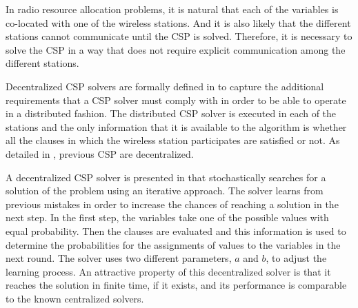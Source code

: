 \documentclass[journal]{IEEEtran}
\newcommand{\Az}[1]{{\color{blue}{#1}}}
\newcommand{\AzCom}[1]{{\it \color{magenta} [#1]}}
\begin{document}
In radio resource allocation problems, it is natural that each of the variables is co-located with one of the wireless stations.
And it is also likely that the different stations cannot communicate until the CSP is solved.
Therefore, it is necessary to solve the CSP in a way that does not require explicit communication among the different stations.

Decentralized CSP solvers are formally defined in \cite{duffy2011dcs} to capture the additional requirements that a CSP solver must comply with in order to be able to operate in a distributed fashion.
The distributed CSP solver is executed in each of the stations and the only information that it is available to the algorithm is whether all the clauses in which the wireless station participates are satisfied or not.
As detailed in \cite{duffy2011dcs}, previous CSP are decentralized.



A decentralized CSP solver is presented in \cite{duffy2011dcs} that stochastically searches for a solution of the problem using an iterative approach. The solver learns from previous mistakes in order to increase the chances of reaching a solution in the next step. In the first step, the variables take one of the possible values with equal probability. Then the clauses are evaluated and this information is used to determine the probabilities for the assignments of values to the variables in the next round.
The solver uses two different parameters, $a$ and $b$, to adjust the learning process.
An attractive property of this decentralized solver is that it reaches the solution in finite time, if it exists, and its performance is comparable to the known centralized solvers.
\end{document}
